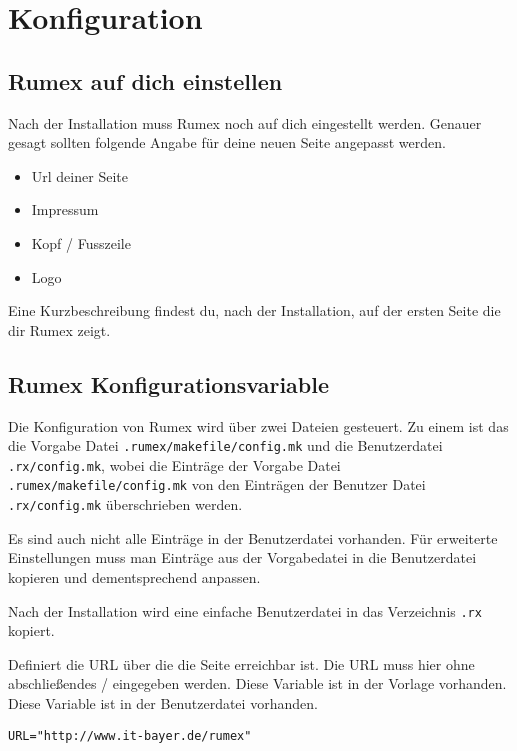  \label{kap:konfiguration}
 \chapter{Konfiguration}


\label{sec:rumex-auf-dich-einstellen}
\section{Rumex auf dich einstellen}

Nach der Installation muss Rumex noch auf dich eingestellt werden.
Genauer gesagt sollten folgende Angabe für deine neuen 
Seite angepasst werden.

\begin{itemize}
\item Url deiner Seite
\item Impressum
\item Kopf / Fusszeile
\item Logo
\end{itemize}

Eine Kurzbeschreibung findest du, nach der Installation, auf der
ersten Seite die dir Rumex zeigt.


\label{sec:rumex-konfigurationsvariable}
\section{Rumex Konfigurationsvariable}

Die Konfiguration von Rumex wird über zwei Dateien gesteuert.
Zu einem ist das die Vorgabe Datei
\verb|.rumex/makefile/config.mk| 
und die Benutzerdatei
\verb|.rx/config.mk|, 
wobei die Einträge der Vorgabe Datei 
\verb|.rumex/makefile/config.mk|
von den Einträgen der Benutzer Datei 
\verb|.rx/config.mk| 
überschrieben werden.

Es sind auch nicht alle Einträge in der Benutzerdatei vorhanden.
Für erweiterte Einstellungen muss man Einträge aus der Vorgabedatei
in die Benutzerdatei kopieren und dementsprechend anpassen.

Nach der Installation wird eine einfache Benutzerdatei in das Verzeichnis
\verb|.rx| kopiert.




{Definiert die URL über die die Seite erreichbar ist.
Die URL muss hier ohne abschließendes / eingegeben werden.}
{Diese Variable ist in der Vorlage vorhanden.}
{Diese Variable ist in der Benutzerdatei vorhanden.}
{\scriptsize
\begin{Verbatim}
URL="http://www.it-bayer.de/rumex"
\end{Verbatim}
}



